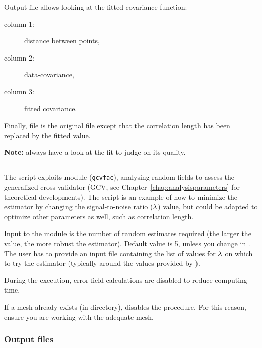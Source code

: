 Output file  allows looking at the fitted covariance function:
\begin{description}
\item[column 1:] distance between points, 
\item[column 2:] data-covariance, 
\item[column 3:] fitted covariance.
\end{description} 

Finally, file  is the original  file except that the correlation length has been replaced by the fitted value. 

\textbf{Note:} always have a look at the fit to judge on its quality. %

\subsection{}

The script  exploits \diva module (\texttt{gcvfac}), analysing random fields to assess the generalized cross validator (GCV, see Chapter~\ref{chap:analysisparameters} for theoretical developments). The script  is an example of how to minimize the estimator by changing the signal-to-noise ratio ($\lambda$) value, but could be adapted to optimize other parameters as well, such as correlation length.

Input to the module is the number of random estimates required (the larger the value, the more robust the estimator). Default value is 5, unless you change in . The user has to provide an input file  containing the list of values for $\lambda$ on which to try the estimator (typically around the values provided by ).

During the  execution, error-field calculations are disabled to reduce computing time. 

\btips
If a mesh already exists (in  directory),  disables the  procedure. For this reason, ensure you are working with the adequate mesh.
\etips

\subsubsection{Output files}

